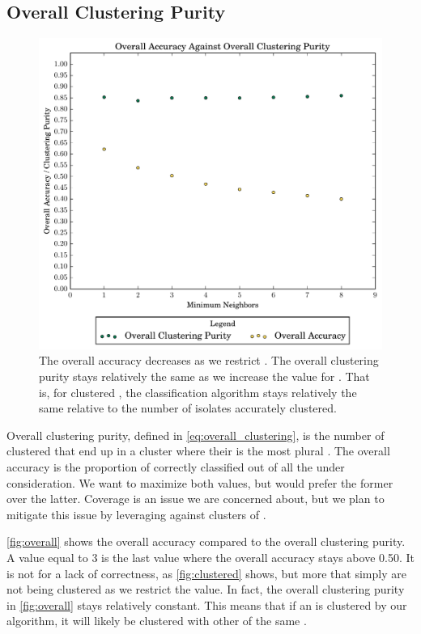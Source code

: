 \subsection{Overall Clustering Purity}
\begin{figure}[ht!]
    \centering
    \includegraphics[width=\linewidth]{figures/bs/neigh_clust_accuracy.pdf}
    \caption{The overall accuracy decreases as we restrict  \minneigh{}. 
    The overall clustering purity stays relatively the same as we increase the value for \minneigh{}. 
    That is, for clustered \isols{}, the classification algorithm stays relatively the same relative to the number of isolates accurately clustered.}
    \label{fig:overall}
\end{figure}

Overall clustering purity, defined in \autoref{eq:overall_clustering}, is the number of \isols{} clustered that end up in a cluster where their \spec{} is the most plural \spec{}. 
The overall accuracy is the proportion of correctly classified \isols{} out of all the \isols{} under consideration.
We want to maximize both values, but would prefer the former over the latter.
Coverage is an issue we are concerned about, but we plan to mitigate this issue by leveraging  \cite{DBLP:conf/bibm/McGovernDKBVG15} against clusters of \isols{}.

\autoref{fig:overall} shows the overall accuracy compared to the overall clustering purity. 
A \minneigh{} value equal to 3 is the last \minneigh{} value where the overall accuracy stays above 0.50.
It is not for a lack of correctness, as \autoref{fig:clustered} shows, but more that \isols{} simply are not being clustered as we restrict the \minneigh{} value.
In fact, the overall clustering purity in \autoref{fig:overall} stays relatively constant.
This means that if an \isol{} is clustered by our algorithm, it will likely be clustered with other \isols{} of the same \spec{}.

